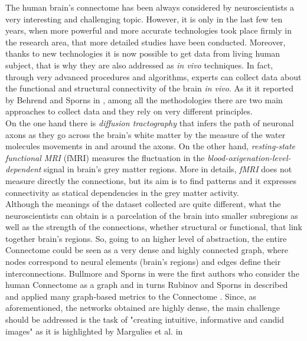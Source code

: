 \documentclass{article}
\begin{document}
\begin{multicols}{2}
The human brain's connectome has been always considered by neuroscientists a very interesting and challenging topic. However, it is only in the last few ten years, when more powerful and more accurate technologies took place firmly in the research area, that more detailed studies have been conducted. Moreover, thanks to new technologies it is now possible to get data from living human subject, that is why they are also addressed as \textit{in vivo} techniques. In fact, through very advanced procedures and algorithms, experts can collect data about the functional and structural connectivity of the brain \textit{in vivo}. As it it reported by Behrend and Sporns in \cite{humanConnectomics}, among all the methodologies there are two main approaches to collect data and they rely on very different principles. \\
On the one hand there is \textit{diffusion tractography} that infers the path of neuronal axons as they go across the brain's white matter by the measure of the water molecules movements in and around the axons. On the other hand, \textit{resting-state functional MRI} (fMRI) measures the fluctuation in the \textit{blood-oxigenation-level-dependent} signal in brain's grey matter regions. More in details, \textit{fMRI} does not measure directly the connections, but its aim is to find patterns and it expresses connectivity as statical dependencies in the grey matter activity. \\
Although the meanings of the dataset collected are quite different, what the neuroscientists can obtain is a parcelation of the brain into smaller subregions as well as the strength of the connections, whether structural or functional, that link together brain's regions. So, going to an higher level of abstraction, the entire Connectome could be seen as a very dense and highly connected graph, where nodes correspond to neural elements (brain's regions) and edges define their interconnections. Bullmore and Sporns in \cite{bullmore2009complex} were the first authors who consider the human Connectome as a graph and in turns Rubinov and Sporns in \cite{complexNetworkMeasures} described and applied many graph-based metrics to the Connectome . Since, as aforementioned, the networks obtained are highly dense, the main challenge should be addressed is the task of "creating intuitive, informative and candid images" as it is highlighted by Margulies et al. in \cite{visualizingHumanConnectome}



\end{multicols}
\end{document}
